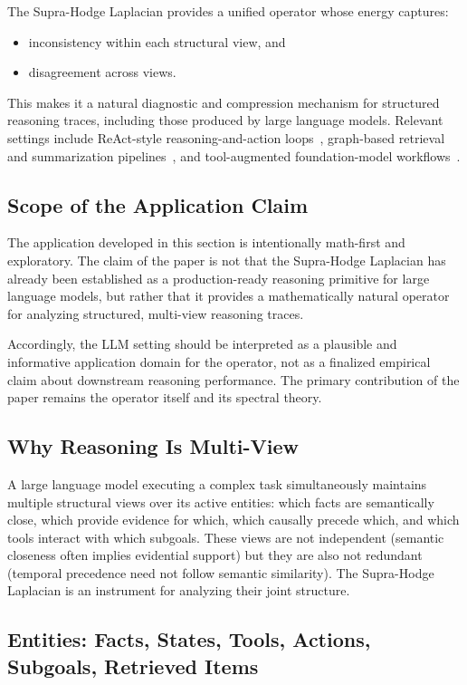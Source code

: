 \documentclass[11pt]{article}
\theoremstyle{definition}
\theoremstyle{remark}
\begin{document}
The Supra-Hodge Laplacian provides a unified operator whose energy captures:
\begin{itemize}
    \item inconsistency within each structural view, and
    \item disagreement across views.
\end{itemize}

This makes it a natural diagnostic and compression mechanism for structured reasoning traces, including those produced by large language models. Relevant settings include ReAct-style reasoning-and-action loops~\cite{yao2023}, graph-based retrieval and summarization pipelines~\cite{edge2024}, and tool-augmented foundation-model workflows~\cite{qin2023}.

\subsection{Scope of the Application Claim}

The application developed in this section is intentionally math-first and exploratory. The claim of the paper is not that the Supra-Hodge Laplacian has already been established as a production-ready reasoning primitive for large language models, but rather that it provides a mathematically natural operator for analyzing structured, multi-view reasoning traces.

Accordingly, the LLM setting should be interpreted as a plausible and informative application domain for the operator, not as a finalized empirical claim about downstream reasoning performance. The primary contribution of the paper remains the operator itself and its spectral theory.

\subsection{Why Reasoning Is Multi-View}

A large language model executing a complex task simultaneously maintains
multiple structural views over its active entities: which facts are semantically
close, which provide evidence for which, which causally precede which, and
which tools interact with which subgoals. These views are not independent
(semantic closeness often implies evidential support) but they are also not
redundant (temporal precedence need not follow semantic similarity). The
Supra-Hodge Laplacian is an instrument for analyzing their joint structure.

\subsection{Entities: Facts, States, Tools, Actions, Subgoals, Retrieved Items}
\end{document}
